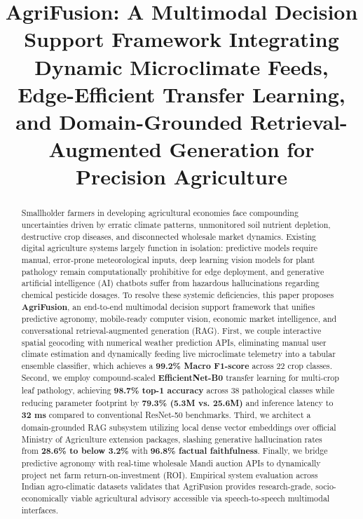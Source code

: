 \documentclass[conference]{IEEEtran}
\begin{document}
\title{AgriFusion: A Multimodal Decision Support Framework Integrating Dynamic Microclimate Feeds, Edge-Efficient Transfer Learning, and Domain-Grounded Retrieval-Augmented Generation for Precision Agriculture}

\author{
}

\maketitle

\begin{abstract}
Smallholder farmers in developing agricultural economies face compounding uncertainties driven by erratic climate patterns, unmonitored soil nutrient depletion, destructive crop diseases, and disconnected wholesale market dynamics. Existing digital agriculture systems largely function in isolation: predictive models require manual, error-prone meteorological inputs, deep learning vision models for plant pathology remain computationally prohibitive for edge deployment, and generative artificial intelligence (AI) chatbots suffer from hazardous hallucinations regarding chemical pesticide dosages. To resolve these systemic deficiencies, this paper proposes \textbf{AgriFusion}, an end-to-end multimodal decision support framework that unifies predictive agronomy, mobile-ready computer vision, economic market intelligence, and conversational retrieval-augmented generation (RAG). First, we couple interactive spatial geocoding with numerical weather prediction APIs, eliminating manual user climate estimation and dynamically feeding live microclimate telemetry into a tabular ensemble classifier, which achieves a \textbf{99.2\% Macro F1-score} across 22 crop classes. Second, we employ compound-scaled \textbf{EfficientNet-B0} transfer learning for multi-crop leaf pathology, achieving \textbf{98.7\% top-1 accuracy} across 38 pathological classes while reducing parameter footprint by \textbf{79.3\% (5.3M vs. 25.6M)} and inference latency to \textbf{32 ms} compared to conventional ResNet-50 benchmarks. Third, we architect a domain-grounded RAG subsystem utilizing local dense vector embeddings over official Ministry of Agriculture extension packages, slashing generative hallucination rates from \textbf{28.6\% to below 3.2\%} with \textbf{96.8\% factual faithfulness}. Finally, we bridge predictive agronomy with real-time wholesale Mandi auction APIs to dynamically project net farm return-on-investment (ROI). Empirical system evaluation across Indian agro-climatic datasets validates that AgriFusion provides research-grade, socio-economically viable agricultural advisory accessible via speech-to-speech multimodal interfaces.
\end{abstract}
\end{document}
